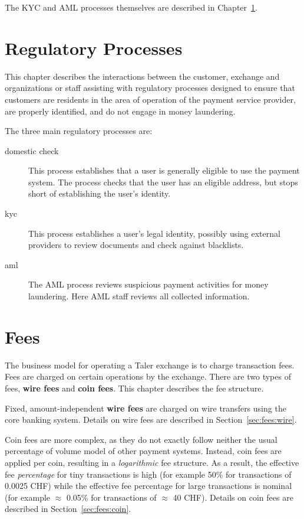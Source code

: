 \documentclass[10pt,a4paper,oneside]{book}
\begin{document}
The KYC and AML processes themselves are described in
Chapter~\ref{chap:regproc}.





%

\chapter{Regulatory Processes} \label{chap:regproc}

This chapter describes the interactions between the customer, exchange and
organizations or staff assisting with regulatory processes designed to ensure
that customers are residents in the area of operation of the payment service
provider, are properly identified, and do not engage in money laundering.

The three main regulatory processes are:

\begin{description}
\item[domestic check] This process establishes that a user is generally
  eligible to use the payment system.  The process checks that the user has an
  eligible address, but stops short of establishing the user's identity.
\item[kyc] This process establishes a user's legal identity, possibly
  using external providers to review documents and check against blacklists.
\item[aml] The AML process reviews suspicious payment activities for
  money laundering. Here AML staff reviews all collected information.
\end{description}






\chapter{Fees} \label{chap:fees}

The business model for operating a Taler exchange is to charge transaction
fees.  Fees are charged on certain operations by the exchange.  There are two
types of fees, {\bf wire fees} and {\bf coin fees}.  This chapter describes
the fee structure.

Fixed, amount-independent {\bf wire fees} are charged on wire transfers using
the core banking system.  Details on wire fees are described in
Section~\ref{sec:fees:wire}.

Coin fees are more complex, as they do not exactly follow neither the usual
percentage of volume model of other payment systems.  Instead, coin fees are
applied per coin, resulting in a {\em logarithmic} fee structure.  As a
result, the effective fee {\em percentage} for tiny transactions is high (for
example 50\% for transactions of 0.0025 CHF) while the effective fee
percentage for large transactions is nominal (for example $\approx$ 0.05\% for
transactions of $\approx$ 40 CHF). Details on coin fees are described in
Section~\ref{sec:fees:coin}.
\end{document}
